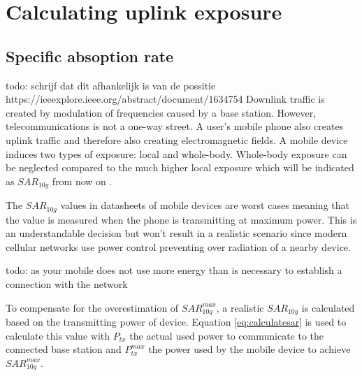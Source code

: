 



\section{Calculating uplink exposure}
\subsection{Specific absoption rate}

todo: schrijf dat dit afhankelijk is van de possitie https://ieeexplore.ieee.org/abstract/document/1634754
Downlink traffic is created by modulation of frequencies caused by a base station. However, telecommunications is not a one-way street. A user's mobile phone also creates uplink traffic and therefore also creating electromagnetic fields. A mobile device induces two types of exposure: local and whole-body. Whole-body exposure can be neglected compared to the much higher local exposure which will be indicated as $SAR_{10g}$ from now on \cite{j10.1.1_gati2010duality}. 

The $SAR_{10g}$ values in datasheets of mobile devices are worst cases meaning that the value is measured when the phone is transmitting at maximum power. This is an understandable decision but won't result in a realistic scenario since modern cellular networks use power control preventing over radiation of a nearby device.

 todo: as your mobile does not use more energy than is necessary to establish a connection with the network

To compensate for the overestimation of $SAR^{max}_{10g}$, a realistic $SAR_{10g}$ is calculated based on the transmitting power of device. Equation \ref{eq:calculatesar} is used to calculate this value with $P_{tx}$ the actual used power to communicate to the connected base station and 
$P^{max}_{tx}$ the power used by the mobile device to achieve ${SAR}^{max}_{10g}$.

